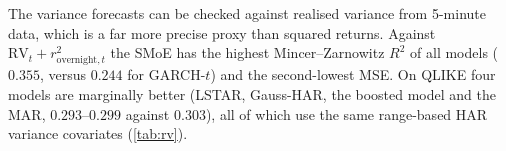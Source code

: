 The variance forecasts can be checked against realised variance from 5-minute data, which is a far
more precise proxy than squared returns. Against $\mathrm{RV}_t+r^2_{\text{overnight},t}$ the SMoE has
the highest Mincer--Zarnowitz $R^2$ of all models ($0.355$, versus $0.244$ for GARCH-$t$) and the
second-lowest MSE. On QLIKE four models are marginally better (LSTAR, Gauss-HAR, the boosted model
and the MAR, $0.293$--$0.299$ against $0.303$), all of which use the same range-based HAR variance
covariates (\cref{tab:rv}).





